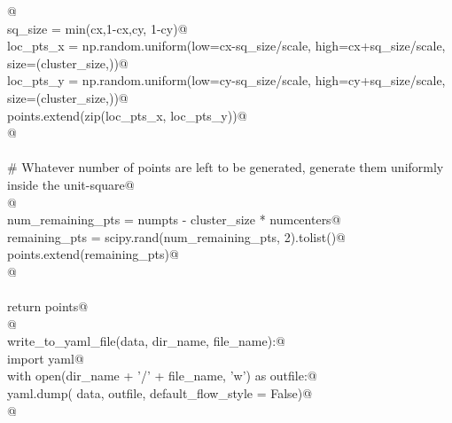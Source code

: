 \documentclass[12.0pt]{report}
\begin{document}
\begin{appendices}
\begin{flushleft}
\begin{list}{}{}
\mbox{}\verb@           @\\
\mbox{}\verb@        sq_size      = min(cx,1-cx,cy, 1-cy)@\\
\mbox{}\verb@        loc_pts_x    = np.random.uniform(low=cx-sq_size/scale, high=cx+sq_size/scale, size=(cluster_size,))@\\
\mbox{}\verb@        loc_pts_y    = np.random.uniform(low=cy-sq_size/scale, high=cy+sq_size/scale, size=(cluster_size,))@\\
\mbox{}\verb@        points.extend(zip(loc_pts_x, loc_pts_y))@\\
\mbox{}\verb@        @\\
\mbox{}\verb@@\\
\mbox{}\verb@    # Whatever number of points are left to be generated, generate them uniformly inside the unit-square@\\
\mbox{}\verb@       @\\
\mbox{}\verb@    num_remaining_pts = numpts - cluster_size * numcenters@\\
\mbox{}\verb@    remaining_pts = scipy.rand(num_remaining_pts, 2).tolist()@\\
\mbox{}\verb@    points.extend(remaining_pts)@\\
\mbox{}\verb@    @\\
\mbox{}\verb@@\\
\mbox{}\verb@    return points@\\
\mbox{}\verb@    @\\
\mbox{}\verb@def write_to_yaml_file(data, dir_name, file_name):@\\
\mbox{}\verb@   import yaml@\\
\mbox{}\verb@   with open(dir_name + '/' + file_name, 'w') as outfile:@\\
\mbox{}\verb@     yaml.dump( data, outfile, default_flow_style = False)@\\
\mbox{}\verb@ @\\
\mbox{}\verb@@\\
\mbox{}\verb@@{\NWsep}
\end{list}
\vspace{-1.5ex}
\footnotesize
\begin{list}{}{\setlength{\itemsep}{-\parsep}\setlength{\itemindent}{-\leftmargin}}

\item{}
\end{list}
\vspace{4ex}
\end{flushleft}




\end{appendices}
\end{document}

